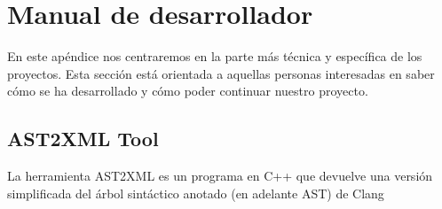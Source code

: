 %
%

\chapter{Manual de desarrollador}

\pagestyle{plain}

En este apéndice nos centraremos en la parte más técnica y específica de los proyectos. Esta sección está orientada a aquellas personas interesadas en saber cómo se ha desarrollado y cómo poder continuar nuestro proyecto.

\section{AST2XML Tool}

La herramienta AST2XML es un programa en C++ que devuelve una versión simplificada del árbol sintáctico anotado (en adelante AST) de Clang

